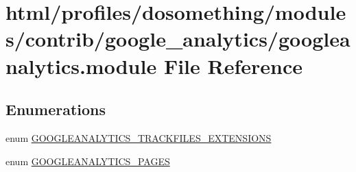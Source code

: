 \hypertarget{googleanalytics_8module}{
\section{html/profiles/dosomething/modules/contrib/google\_\-analytics/googleanalytics.module File Reference}
\label{googleanalytics_8module}
}
\subsection*{Enumerations}
\begin{DoxyCompactItemize}
\item 
enum \hyperlink{googleanalytics_8module_aa0572ed144cfe47392ab87e9d6410f86}{GOOGLEANALYTICS\_\-TRACKFILES\_\-EXTENSIONS} 
\item 
enum \hyperlink{googleanalytics_8module_a641baa5dc31e9236204577c6f44e32cf}{GOOGLEANALYTICS\_\-PAGES} 
\end{DoxyCompactItemize}
